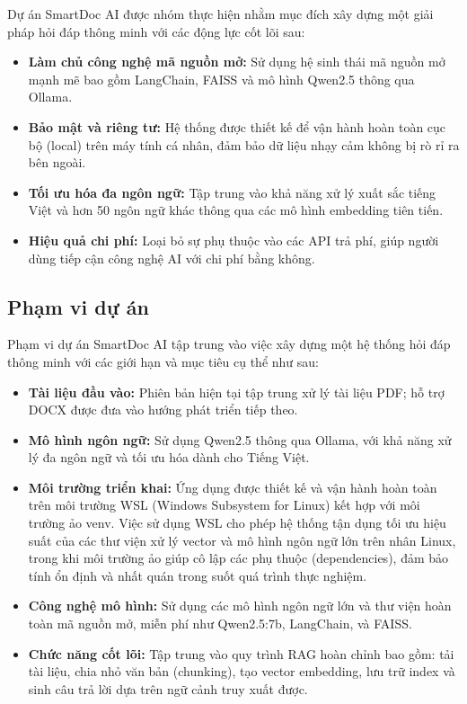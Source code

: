 \documentclass[conference]{IEEEtran}
\begin{document}
Dự án SmartDoc AI được nhóm thực hiện nhằm mục đích xây dựng một giải pháp hỏi đáp thông minh với các động lực cốt lõi sau:
\begin{itemize}
  \item \textbf{Làm chủ công nghệ mã nguồn mở:} Sử dụng hệ sinh thái mã nguồn mở mạnh mẽ bao gồm LangChain, FAISS và mô hình Qwen2.5 thông qua Ollama.
  \item \textbf{Bảo mật và riêng tư:} Hệ thống được thiết kế để vận hành hoàn toàn cục bộ (local) trên máy tính cá nhân, đảm bảo dữ liệu nhạy cảm không bị rò rỉ ra bên ngoài.
  \item \textbf{Tối ưu hóa đa ngôn ngữ:} Tập trung vào khả năng xử lý xuất sắc tiếng Việt và hơn 50 ngôn ngữ khác thông qua các mô hình embedding tiên tiến.
  \item \textbf{Hiệu quả chi phí:} Loại bỏ sự phụ thuộc vào các API trả phí, giúp người dùng tiếp cận công nghệ AI với chi phí bằng không.
\end{itemize}

\subsection{Phạm vi dự án}

Phạm vi dự án SmartDoc AI tập trung vào việc xây dựng một hệ thống hỏi đáp thông minh với các giới hạn và mục tiêu cụ thể như sau:
\begin{itemize}
  \item \textbf{Tài liệu đầu vào:} Phiên bản hiện tại tập trung xử lý tài liệu PDF; hỗ trợ DOCX được đưa vào hướng phát triển tiếp theo.
  \item \textbf{Mô hình ngôn ngữ:} Sử dụng Qwen2.5 thông qua Ollama, với khả năng xử lý đa ngôn ngữ và tối ưu hóa dành cho Tiếng Việt.
  \item \textbf{Môi trường triển khai:} Ứng dụng được thiết kế và vận hành hoàn toàn trên môi trường WSL (Windows Subsystem for Linux) kết hợp với môi trường ảo venv. Việc sử dụng WSL cho phép hệ thống tận dụng tối ưu hiệu suất của các thư viện xử lý vector và mô hình ngôn ngữ lớn trên nhân Linux, trong khi môi trường ảo giúp cô lập các phụ thuộc (dependencies), đảm bảo tính ổn định và nhất quán trong suốt quá trình thực nghiệm.
  \item \textbf{Công nghệ mô hình:} Sử dụng các mô hình ngôn ngữ lớn và thư viện hoàn toàn mã nguồn mở, miễn phí như Qwen2.5:7b, LangChain, và FAISS.
  \item \textbf{Chức năng cốt lõi:} Tập trung vào quy trình RAG hoàn chỉnh bao gồm: tải tài liệu, chia nhỏ văn bản (chunking), tạo vector embedding, lưu trữ index và sinh câu trả lời dựa trên ngữ cảnh truy xuất được.
\end{itemize}
\end{document}

